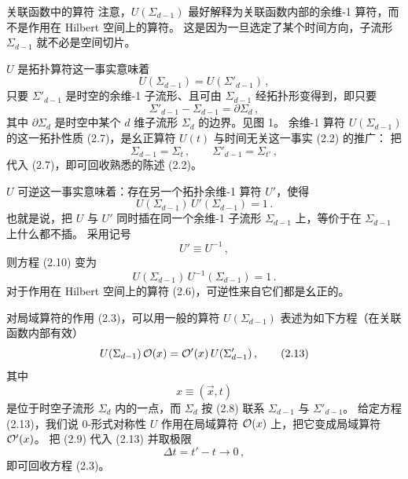 \begin{notebox}{关联函数中的算符}
注意，$U(\Sigma_{d-1})$ 最好解释为关联函数内部的余维-1 算符，而不是作用在 Hilbert 空间上的算符。
这是因为一旦选定了某个时间方向，子流形 $\Sigma_{d-1}$ 就不必是空间切片。
\end{notebox}

$U$ 是拓扑算符这一事实意味着
\begin{equation}
    U(\Sigma_{d-1})=U(\Sigma'_{d-1})\,, \tag{2.7}
\end{equation}
只要 $\Sigma'_{d-1}$ 是时空的余维-1 子流形、且可由 $\Sigma_{d-1}$ 经拓扑形变得到，即只要
\begin{equation}
    \Sigma'_{d-1}-\Sigma_{d-1}=\partial\Sigma_d\,, \tag{2.8}
\end{equation}
其中 $\partial\Sigma_d$ 是时空中某个 $d$ 维子流形 $\Sigma_d$ 的边界。见图 1。
余维-1 算符 $U(\Sigma_{d-1})$ 的这一拓扑性质 (2.7)，是幺正算符 $U(t)$ 与时间无关这一事实 (2.2) 的推广：
把
\begin{equation}
    \Sigma_{d-1}=\Sigma_t\,,\qquad \Sigma'_{d-1}=\Sigma_{t'}\,, \tag{2.9}
\end{equation}
代入 (2.7)，即可回收熟悉的陈述 (2.2)。

$U$ 可逆这一事实意味着：存在另一个拓扑余维-1 算符 $U'$，使得
\begin{equation}
    U(\Sigma_{d-1})\,U'(\Sigma_{d-1})=1\,. \tag{2.10}
\end{equation}
也就是说，把 $U$ 与 $U'$ 同时插在同一个余维-1 子流形 $\Sigma_{d-1}$ 上，等价于在 $\Sigma_{d-1}$ 上什么都不插。
采用记号
\begin{equation}
    U'\equiv U^{-1}\,, \tag{2.11}
\end{equation}
则方程 (2.10) 变为
\begin{equation}
    U(\Sigma_{d-1})\,U^{-1}(\Sigma_{d-1})=1\,. \tag{2.12}
\end{equation}
对于作用在 Hilbert 空间上的算符 (2.6)，可逆性来自它们都是幺正的。

对局域算符的作用 (2.3)，可以用一般的算符 $U(\Sigma_{d-1})$ 表述为如下方程（在关联函数内部有效）
\begin{equation}
    U(\Sigma_{d-1})\,\mathcal{O}(x)=\mathcal{O}'(x)\,U(\Sigma'_{d-1})\,, \tag{2.13}
\end{equation}
其中
\begin{equation}
    x\equiv(\vec{x},t) \tag{2.14}
\end{equation}
是位于时空子流形 $\Sigma_d$ 内的一点，而 $\Sigma_d$ 按 (2.8) 联系 $\Sigma_{d-1}$ 与 $\Sigma'_{d-1}$。
给定方程 (2.13)，我们说 0-形式对称性 $U$ 作用在局域算符 $\mathcal{O}(x)$ 上，把它变成局域算符 $\mathcal{O}'(x)$。
把 (2.9) 代入 (2.13) 并取极限
\begin{equation}
    \Delta t=t'-t\to0\,, \tag{2.15}
\end{equation}
即可回收方程 (2.3)。

